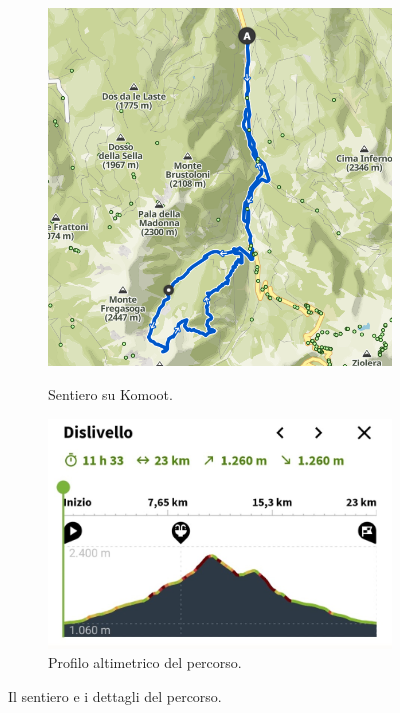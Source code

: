 \documentclass{article}
\begin{document}
\begin{figure}[htbp!]
    \begin{subfigure}[t]{0.45\textwidth}
        \centering
        \vspace{0pt} %
        \includegraphics[width=\textwidth]{images/sentiero_komoot_Giro1.png}
        \caption{Sentiero su Komoot.}
        \label{fig:foto_corta1}
        \vspace{1em} %
        \includegraphics[width=\textwidth]{images/profilo_altimetrico_Giro1.jpg}
        \caption{Profilo altimetrico del percorso.}
        \label{fig:foto_corta2}
    \end{subfigure}
    \caption{Il sentiero e i dettagli del percorso.}
    \label{fig:panoramica_dettagli_giro1}
\end{figure}
\end{document}

